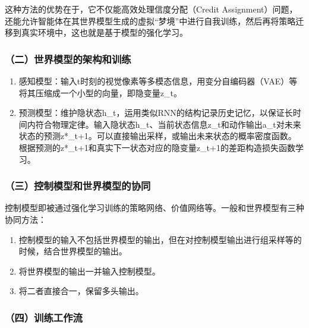 这种方法的优势在于，它不仅能高效处理信度分配（Credit Assignment）问题，还能允许智能体在其世界模型生成的虚拟``梦境''中进行自我训练，然后再将策略迁移到真实环境中，这也就是基于模型的强化学习。

\hypertarget{ux4e8cux4e16ux754cux6a21ux578bux7684ux67b6ux6784ux548cux8badux7ec3}{%
\subsubsection{（二）世界模型的架构和训练}\label{ux4e8cux4e16ux754cux6a21ux578bux7684ux67b6ux6784ux548cux8badux7ec3}}

\begin{enumerate}
\def\labelenumi{\arabic{enumi}.}
\item
  感知模型：输入t时刻的视觉像素等多模态信息，用变分自编码器（VAE）等将其压缩成一个小型的向量，即隐变量z\_t。
\item
  预测模型：维护隐状态h\_t，运用类似RNN的结构记录历史记忆，以保证长时间内符合物理定律。输入隐状态h\_t、当前状态信息z\_t和动作输出a\_t对未来状态的预测z*\_t+1。可以直接输出采样，或输出未来状态的概率密度函数。根据预测的z*\_t+1和真实下一状态对应的隐变量z\_t+1的差距构造损失函数学习。
\end{enumerate}

\hypertarget{ux4e09ux63a7ux5236ux6a21ux578bux548cux4e16ux754cux6a21ux578bux7684ux534fux540c}{%
\subsubsection{（三）控制模型和世界模型的协同}\label{ux4e09ux63a7ux5236ux6a21ux578bux548cux4e16ux754cux6a21ux578bux7684ux534fux540c}}

控制模型即被通过强化学习训练的策略网络、价值网络等。一般和世界模型有三种协同方法：

\begin{enumerate}
\def\labelenumi{\arabic{enumi}.}
\item
  控制模型的输入不包括世界模型的输出，但在对控制模型输出进行组采样等的时候，结合世界模型的输出。
\item
  将世界模型的输出一并输入控制模型。
\item
  将二者直接合一，保留多头输出。
\end{enumerate}

\hypertarget{ux56dbux8badux7ec3ux5de5ux4f5cux6d41}{%
\subsubsection{（四）训练工作流}\label{ux56dbux8badux7ec3ux5de5ux4f5cux6d41}}

